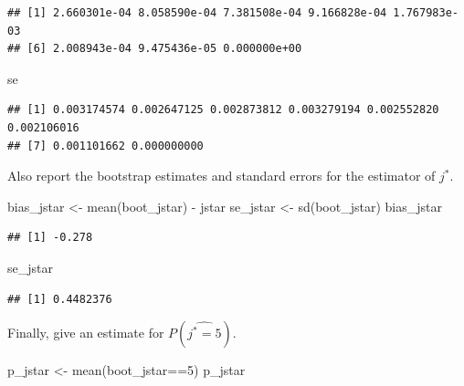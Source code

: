 \documentclass[
]{article}
\newenvironment{Shaded}{\begin{snugshade}}{\end{snugshade}}
\newcommand{\DecValTok}[1]{\textcolor[rgb]{0.00,0.00,0.81}{#1}}
\newcommand{\FunctionTok}[1]{\textcolor[rgb]{0.00,0.00,0.00}{#1}}
\newcommand{\NormalTok}[1]{#1}
\newcommand{\OtherTok}[1]{\textcolor[rgb]{0.56,0.35,0.01}{#1}}
\newcommand{\SpecialCharTok}[1]{\textcolor[rgb]{0.00,0.00,0.00}{#1}}
\begin{document}
\begin{verbatim}
## [1] 2.660301e-04 8.058590e-04 7.381508e-04 9.166828e-04 1.767983e-03
## [6] 2.008943e-04 9.475436e-05 0.000000e+00
\end{verbatim}

\begin{Shaded}
\begin{Highlighting}[]
\NormalTok{se}
\end{Highlighting}
\end{Shaded}

\begin{verbatim}
## [1] 0.003174574 0.002647125 0.002873812 0.003279194 0.002552820 0.002106016
## [7] 0.001101662 0.000000000
\end{verbatim}

Also report the bootstrap estimates and standard errors for the
estimator of \(j^*\).

\begin{Shaded}
\begin{Highlighting}[]
\NormalTok{bias\_jstar }\OtherTok{\textless{}{-}} \FunctionTok{mean}\NormalTok{(boot\_jstar) }\SpecialCharTok{{-}}\NormalTok{ jstar}
\NormalTok{se\_jstar }\OtherTok{\textless{}{-}} \FunctionTok{sd}\NormalTok{(boot\_jstar)}
\NormalTok{bias\_jstar}
\end{Highlighting}
\end{Shaded}

\begin{verbatim}
## [1] -0.278
\end{verbatim}

\begin{Shaded}
\begin{Highlighting}[]
\NormalTok{se\_jstar}
\end{Highlighting}
\end{Shaded}

\begin{verbatim}
## [1] 0.4482376
\end{verbatim}

Finally, give an estimate for \(P(\hat{j^*=5})\).

\begin{Shaded}
\begin{Highlighting}[]
\NormalTok{p\_jstar }\OtherTok{\textless{}{-}} \FunctionTok{mean}\NormalTok{(boot\_jstar}\SpecialCharTok{==}\DecValTok{5}\NormalTok{)}
\NormalTok{p\_jstar}
\end{Highlighting}
\end{Shaded}
\end{document}
